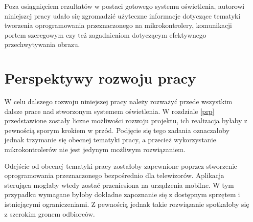 \documentclass[12pt]{report}
\begin{document}
Poza osiągnięciem rezultatów w postaci gotowego systemu oświetlenia, autorowi niniejszej pracy udało się zgromadzić użyteczne informacje dotyczące tematyki tworzenia oprogramowania przeznaczonego na mikrokontrolery, komunikacji portem szeregowym czy też zagadnieniom dotyczącym efektywnego przechwytywania obrazu.

\section{Perspektywy rozwoju pracy}

W celu dalszego rozwoju niniejszej pracy należy rozważyć przede wszystkim dalsze prace nad stworzonym systemem oświetlenia. W rozdziale \ref{prp} przedstawione zostały liczne możliwości rozwoju projektu, ich realizacja byłaby z pewnością sporym krokiem w przód. Podjęcie się tego zadania oznaczałoby jednak trzymanie się obecnej tematyki pracy, a przecież wykorzystanie mikrokontrolerów nie jest jedynym możliwym rozwiązaniem. 

Odejście od obecnej tematyki pracy zostałoby zapewnione poprzez stworzenie oprogramowania przeznaczonego bezpośrednio dla telewizorów. Aplikacja steru\-jąca mogłaby wtedy zostać przeniesiona na urządzenia mobilne. W tym przypadku wymagane byłoby dokładne zapoznanie się z dostępnym sprzętem i istniejącymi ograniczeniami. Z pewnością jednak takie rozwiązanie spotkałoby się z szerokim gronem odbiorców.
\end{document}
